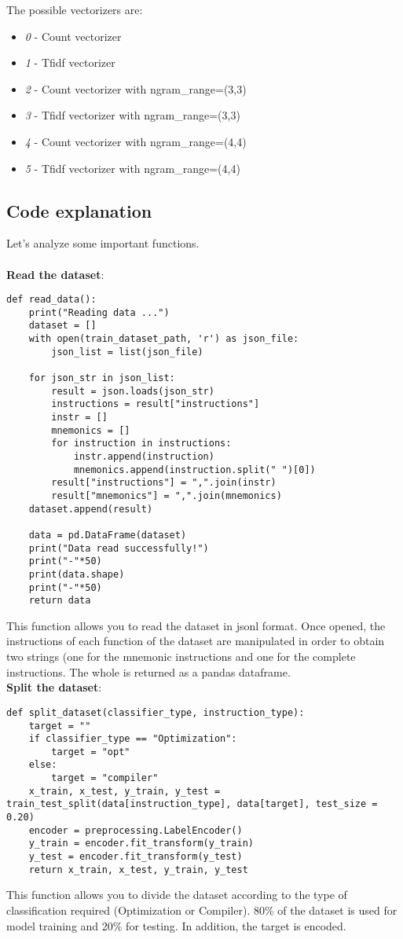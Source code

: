 \documentclass[11pt]{article}
\begin{document}
The possible vectorizers are:
\begin{itemize}
	\item \textit{0} - Count vectorizer
	\item \textit{1} - Tfidf vectorizer
	\item \textit{2} - Count vectorizer with ngram\_range=(3,3)
	\item \textit{3} - Tfidf vectorizer with ngram\_range=(3,3)
	\item \textit{4} - Count vectorizer with ngram\_range=(4,4)
	\item \textit{5} - Tfidf vectorizer with ngram\_range=(4,4)
\end{itemize}

\subsection{Code explanation}
Let's analyze some important functions.\\ \\
\textbf{Read the dataset}:
\begin{lstlisting}
def read_data():
	print("Reading data ...")
	dataset = []
	with open(train_dataset_path, 'r') as json_file:
		json_list = list(json_file)
	
	for json_str in json_list:
		result = json.loads(json_str)
		instructions = result["instructions"]
		instr = []
		mnemonics = []
		for instruction in instructions:
			instr.append(instruction)
			mnemonics.append(instruction.split(" ")[0])
		result["instructions"] = ",".join(instr)
		result["mnemonics"] = ",".join(mnemonics)
	dataset.append(result)
	
	data = pd.DataFrame(dataset)
	print("Data read successfully!")
	print("-"*50)
	print(data.shape)
	print("-"*50)
	return data
\end{lstlisting}
This function allows you to read the dataset in jsonl format. Once opened, the instructions of each function of the dataset are manipulated in order to obtain two strings (one for the mnemonic instructions and one for the complete instructions. The whole is returned as a pandas dataframe. \\

\textbf{Split the dataset}:
\begin{lstlisting}
def split_dataset(classifier_type, instruction_type):
	target = ""
	if classifier_type == "Optimization":
		target = "opt"
	else:
		target = "compiler"
	x_train, x_test, y_train, y_test = train_test_split(data[instruction_type], data[target], test_size = 0.20)
	encoder = preprocessing.LabelEncoder()
	y_train = encoder.fit_transform(y_train)
	y_test = encoder.fit_transform(y_test)
	return x_train, x_test, y_train, y_test
\end{lstlisting}
This function allows you to divide the dataset according to the type of classification required (Optimization or Compiler). 80\% of the dataset is used for model training and 20\% for testing. In addition, the target is encoded. \\
\end{document}
